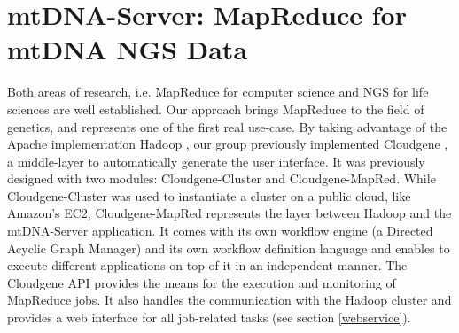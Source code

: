 \section{mtDNA-Server: MapReduce for mtDNA NGS Data}
Both areas of research, i.e. MapReduce for computer science and NGS for life sciences are well established. Our approach brings MapReduce to the field of genetics, and represents one of the first real use-case. By taking advantage of the Apache implementation Hadoop \cite{White2009}, our group previously implemented Cloudgene \cite{Schonherr2012}, a middle-layer to automatically generate the user interface. It was previously designed with two modules: Cloudgene-Cluster and Cloudgene-MapRed. While Cloudgene-Cluster was used to instantiate a cluster on a public cloud, like Amazon's EC2, Cloudgene-MapRed represents the layer between Hadoop and the mtDNA-Server application. It comes with its own workflow engine (a Directed Acyclic Graph Manager) and its own workflow definition language and enables to execute different applications on top of it in an independent manner. The Cloudgene API provides the means for the execution and monitoring of MapReduce jobs. It also handles the communication with the Hadoop cluster and provides a web interface for all job-related tasks  \cite{Weissensteiner2016b} (see section \ref{webservice}).

